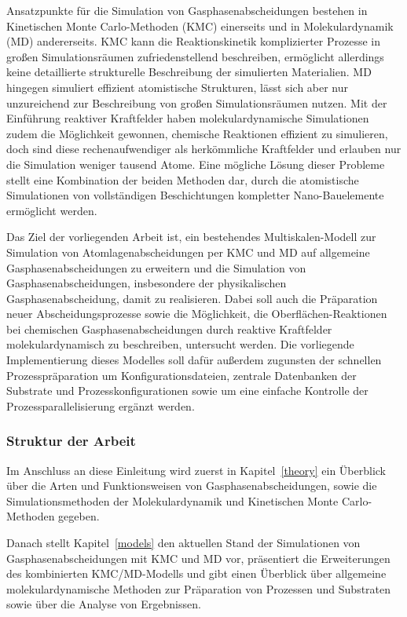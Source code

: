 Ansatzpunkte für die Simulation von Gasphasenabscheidungen bestehen in Kinetischen Monte Carlo-Methoden (KMC) einerseits und in Molekulardynamik (MD) andererseits.
KMC kann die Reaktionskinetik komplizierter Prozesse in großen Simulationsräumen zufriedenstellend beschreiben, ermöglicht allerdings keine detaillierte strukturelle Beschreibung der simulierten Materialien.
MD hingegen simuliert effizient atomistische Strukturen, lässt sich aber nur unzureichend zur Beschreibung von großen Simulationsräumen nutzen.
Mit der Einführung reaktiver Kraftfelder haben molekulardynamische Simulationen zudem die Möglichkeit gewonnen, chemische Reaktionen effizient zu simulieren, doch sind diese rechenaufwendiger als herkömmliche Kraftfelder und erlauben nur die Simulation weniger tausend Atome.
Eine mögliche Lösung dieser Probleme stellt eine Kombination der beiden Methoden dar, durch die atomistische Simulationen von vollständigen Beschichtungen kompletter Nano-Bauelemente ermöglicht werden.


Das Ziel der vorliegenden Arbeit ist, ein bestehendes Multiskalen-Modell zur Simulation von Atomlagenabscheidungen per KMC und MD auf allgemeine Gasphasenabscheidungen zu erweitern und die Simulation von Gasphasenabscheidungen, insbesondere der physikalischen Gasphasenabscheidung, damit zu realisieren.
Dabei soll auch die Präparation neuer Abscheidungsprozesse sowie die Möglichkeit, die Oberflächen-Reaktionen bei chemischen Gasphasenabscheidungen durch reaktive Kraftfelder molekulardynamisch zu beschreiben, untersucht werden.
Die vorliegende Implementierung dieses Modelles soll dafür außerdem zugunsten der schnellen Prozesspräparation um Konfigurationsdateien, zentrale Datenbanken der Substrate und Prozesskonfigurationen sowie um eine einfache Kontrolle der Prozessparallelisierung ergänzt werden.

\subsubsection{Struktur der Arbeit}

Im Anschluss an diese Einleitung wird zuerst in Kapitel~\ref{theory} ein Überblick über die Arten und Funktionsweisen von Gasphasenabscheidungen, sowie die Simulationsmethoden der Molekulardynamik und Kinetischen Monte Carlo-Methoden gegeben.

Danach stellt Kapitel~\ref{models} den aktuellen Stand der Simulationen von Gasphasenabscheidungen mit KMC und MD vor, präsentiert die Erweiterungen des kombinierten KMC/MD-Modells und gibt einen Überblick über allgemeine molekulardynamische Methoden zur Präparation von Prozessen und Substraten sowie über die Analyse von Ergebnissen.

